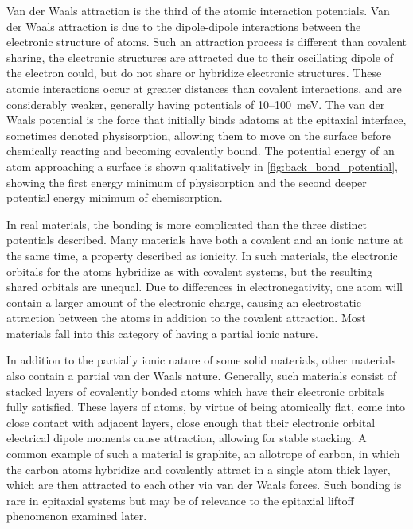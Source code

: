 Van der Waals attraction is the third of the atomic interaction potentials.
Van der Waals attraction is due to the dipole-dipole interactions between the electronic structure of atoms.
Such an attraction process is different than covalent sharing, the electronic structures are attracted due to their oscillating dipole of the electron could, but do not share or hybridize electronic structures.
These atomic interactions occur at greater distances than covalent interactions, and are considerably weaker, generally having potentials of 10--100~meV\@. The van der Waals potential is the force that initially binds adatoms at the epitaxial interface, sometimes denoted physisorption, allowing them to move on the surface before chemically reacting and becoming covalently bound.
The potential energy of an atom approaching a surface is shown qualitatively in \cref{fig:back_bond_potential}, showing the first energy minimum of physisorption and the second deeper potential energy minimum of chemisorption.

In real materials, the bonding is more complicated than the three distinct potentials described.
Many materials have both a covalent and an ionic nature at the same time, a property described as ionicity.
In such materials, the electronic orbitals for the atoms hybridize as with covalent systems, but the resulting shared orbitals are unequal.
Due to differences in electronegativity, one atom will contain a larger amount of the electronic charge, causing an electrostatic attraction between the atoms in addition to the covalent attraction.
Most materials fall into this category of having a partial ionic nature.

In addition to the partially ionic nature of some solid materials, other materials also contain a partial van der Waals nature.
Generally, such materials consist of stacked layers of covalently bonded atoms which have their electronic orbitals fully satisfied.
These layers of atoms, by virtue of being atomically flat, come into close contact with adjacent layers, close enough that their electronic orbital electrical dipole moments cause attraction, allowing for stable stacking.
A common example of such a material is graphite, an allotrope of carbon, in which the carbon atoms hybridize and covalently attract in a single atom thick layer, which are then attracted to each other via van der Waals forces.
Such bonding is rare in epitaxial systems but may be of relevance to the epitaxial liftoff phenomenon examined later.


